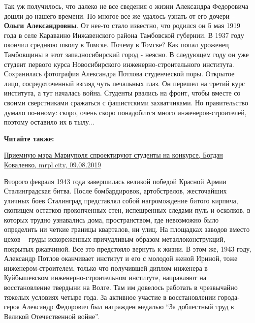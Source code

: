 Так уж получилось, что далеко не все сведения о жизни Александра Федоровича
дошли до нашего времени. Но многое все же удалось узнать от его дочери – \textbf{Ольги
Александровны}. От нее-то стало известно, что родился он 5 мая 1919 года в селе
Караваино Инжавенского района Тамбовской губернии. В 1937 году окончил среднюю
школу в Томске. Почему в Томске? Как попал уроженец Тамбовщины в этот
западносибирский город - неясно. В следующем году он уже студент первого курса
Новосибирского инженерно-строительного института. Сохранилась фотография
Александра Потлова студенческой поры. Открытое лицо, сосредоточенный взгляд
чуть печальных глаз. Он перешел на третий курс института, а тут началась война.
Студенты рвались на фронт, чтобы вместе со своими сверстниками сражаться с
фашистскими захватчиками. Но правительство думало по-иному: скоро, очень скоро
понадобится много инженеров-строителей, поэтому оставило их в тылу...

\textbf{Читайте также:} 

\href{https://mrpl.city/news/view/priemnuyu-me-ra-mariupolya-sproektiruyut-studenty-na-konkurse}{%
Приемную мэра Мариуполя спроектируют студенты на конкурсе, Богдан Коваленко, mrpl.city, 09.08.2019}

Второго февраля 1943 года завершилась великой победой Красной Армии
Сталинградская битва. После бомбардировок, артобстрелов, жесточайших уличных
боев Сталинград представлял собой нагромождение битого кирпича, скопищем
остатков прокопченных стен, испещренных следами пуль и осколков, в которых
трудно узнавались дома, пространством, где невозможно было определить ни четкие
границы кварталов, ни улиц. На площадках заводов вместо цехов – груды
искореженных причудливым образом металлоконструкций, покрытых ржавчиной. Все
это предстояло вернуть к жизни. В этом же, 1943 году, Александр Потлов
оканчивает институт и его с молодой женой Ириной, тоже инженером-строителем,
только что получившей диплом инженера в Куйбышевском инженерно-строительном
институте, направляют на восстановление твердыни на Волге. Там им довелось
работать в чрезвычайно тяжелых условиях четыре года. За активное участие в
восстановлении города-героя Александр Федорович был награжден медалью
\enquote{За доблестный труд в Великой Отечественной войне}.

